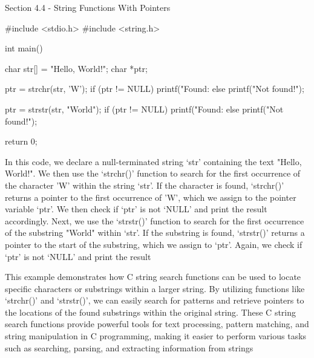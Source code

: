 \begin{notes}{Section 4.4 - String Functions With Pointers}
\begin{highlight}
    \begin{code}[C++]   
    #include <stdio.h>
    #include <string.h>
    
    int main() {
        char str[] = "Hello, World!";
        char *ptr;
    
        ptr = strchr(str, 'W');
        if (ptr != NULL) {
            printf("Found: %
        } else {
            printf("Not found!\n");
        }
    
        ptr = strstr(str, "World");
        if (ptr != NULL) {
            printf("Found: %
        } else {
            printf("Not found!\n");
        }
    
        return 0;
    }
    \end{code}
        In this code, we declare a null-terminated string `str' containing the text "Hello, World!". We then use the `strchr()' function to search for the first occurrence of the character 'W' within the string `str'. If the character is found, `strchr()' 
        returns a pointer to the first occurrence of 'W', which we assign to the pointer variable `ptr'. We then check if `ptr' is not `NULL' and print the result accordingly. Next, we use the `strstr()' function to search for the first occurrence of the 
        substring "World" within `str'. If the substring is found, `strstr()' returns a pointer to the start of the substring, which we assign to `ptr'. Again, we check if `ptr' is not `NULL' and print the result
        
        This example demonstrates how C string search functions can be used to locate specific characters or substrings within a larger string. By utilizing functions like `strchr()' and `strstr()', we can easily search for patterns and retrieve pointers 
        to the locations of the found substrings within the original string. These C string search functions provide powerful tools for text processing, pattern matching, and string manipulation in C programming, making it easier to perform various tasks 
        such as searching, parsing, and extracting information from strings
    \end{highlight}
\end{notes}

